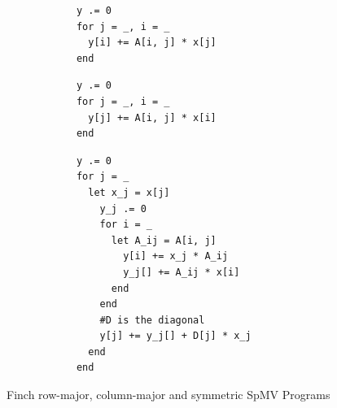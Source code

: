 \begin{figure}
    \begin{minipage}[t]{0.18\textwidth}
        \vspace{0pt} %
        \begin{verbatim}
            y .= 0
            for j = _, i = _
              y[i] += A[i, j] * x[j]
            end
        \end{verbatim}
        \vspace{24pt} %
        \begin{verbatim}
            y .= 0
            for j = _, i = _
              y[j] += A[i, j] * x[i]
            end
        \end{verbatim}
    \end{minipage}\hfill%
    \begin{minipage}[t]{0.22\textwidth}
        \vspace{0pt} %
        \begin{verbatim}
            y .= 0
            for j = _
              let x_j = x[j]
                y_j .= 0
                for i = _
                  let A_ij = A[i, j]
                    y[i] += x_j * A_ij
                    y_j[] += A_ij * x[i]
                  end
                end
                #D is the diagonal
                y[j] += y_j[] + D[j] * x_j
              end
            end
        \end{verbatim}
    \end{minipage}
    \vspace{-8pt}
    \caption{Finch row-major, column-major and symmetric SpMV Programs}
    \label{spmv_programs}
    \vspace{-12pt}
\end{figure}




